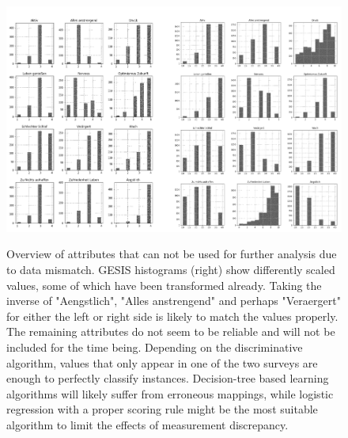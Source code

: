 \begin{figure}[ht]
	\begin{center}
		\includegraphics[scale=0.62,angle=0]{fig/histo}
		\label{std}
		\caption{Overview of attributes that can not be used for further analysis due to data mismatch. GESIS histograms (right) show differently scaled values, some of which have been transformed already. Taking the inverse of "Aengstlich", "Alles anstrengend" and perhaps "Veraergert" for either the left or right side is likely to match the values properly. The remaining attributes do not seem to be reliable and will not be included for the time being. Depending on the discriminative algorithm, values ​​that only appear in one of the two surveys are enough to perfectly classify instances. Decision-tree based learning algorithms will likely suffer from erroneous mappings, while logistic regression with a proper scoring rule might be the most suitable algorithm to limit the effects of measurement discrepancy.}
	\end{center}
\end{figure}



